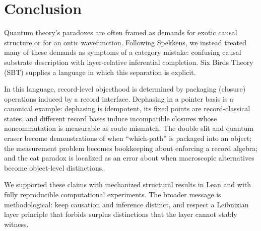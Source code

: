 \section{Conclusion}\label{sec:conclusion}

Quantum theory's paradoxes are often framed as demands for exotic causal structure or for an ontic wavefunction.
Following Spekkens, we instead treated many of these demands as symptoms of a category mistake: confusing causal substrate description with layer-relative inferential completion.
Six Birds Theory (SBT) supplies a language in which this separation is explicit.

In this language, record-level objecthood is determined by packaging (closure) operations induced by a record interface.
Dephasing in a pointer basis is a canonical example: dephasing is idempotent, its fixed points are record-classical states, and different record bases induce incompatible closures whose noncommutation is measurable as route mismatch.
The double slit and quantum eraser become demonstrations of when ``which-path'' is packaged into an object; the measurement problem becomes bookkeeping about enforcing a record algebra; and the cat paradox is localized as an error about when macroscopic alternatives become object-level distinctions.

We supported these claims with mechanized structural results in Lean and with fully reproducible computational experiments.
The broader message is methodological: keep causation and inference distinct, and respect a Leibnizian layer principle that forbids surplus distinctions that the layer cannot stably witness.
